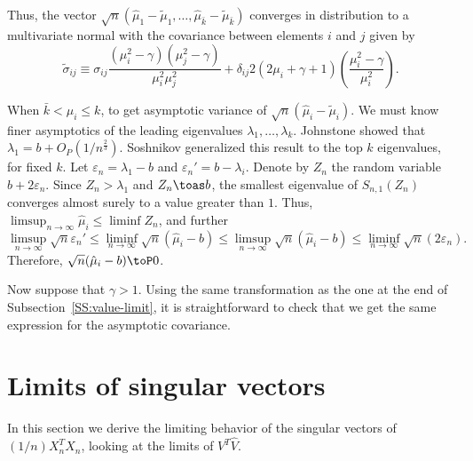 Thus, the vector 
\(
    \sqrt{n} 
    (\hat \mu_1 - \tilde \mu_1, 
     \ldots, 
     \hat \mu_{\bar k} - \tilde \mu_{\bar k}
    )
\)
converges in distribution to a multivariate normal with the covariance
between elements $i$ and $j$ given by
\[
    \tilde \sigma_{ij}
    \equiv
    \sigma_{ij} 
    \frac{(\mu_i^2 - \gamma)(\mu_j^2 - \gamma)}{\mu_i^2 \mu_j^2}
    +
    \delta_{ij}
    2(2\mu_i + \gamma + 1)
    \left(
        \frac{\mu_i^2 - \gamma}{\mu_i^2}
    \right).
\]

When $\bar k < \mu_i \leq k$, to get asymptotic variance of
$\sqrt{n} (\hat \mu_i - \tilde \mu_i)$.  We must know finer asymptotics of
the leading eigenvalues $\lambda_1, \ldots, \lambda_k$.  Johnstone
\cite{johnstone2001dle} showed that $\lambda_1 = b + O_P(1/n^\frac{2}{3})$.
Soshnikov \cite{soshnikov2002nud} generalized this result to the top
$k$ eigenvalues, for fixed $k$.  Let $\varepsilon_n = \lambda_1 - b$  and
$\varepsilon_n' = b - \lambda_i$.  Denote by $Z_n$ the random variable
$b + 2 \varepsilon_n$. Since $Z_n > \lambda_1$ and $Z_n \toas b$,
the smallest eigenvalue of $S_{n,1} (Z_n)$ converges almost surely to a
value greater than $1$.  Thus, 
$\limsup_{n\to\infty} \hat \mu_i \leq \liminf Z_n$, and further
\[
    \limsup_{n\to\infty} \sqrt{n} \varepsilon_n'
    \leq
    \liminf_{n\to\infty} \sqrt{n} (\hat \mu_i - b)
    \leq
    \limsup_{n\to\infty} \sqrt{n} (\hat \mu_i - b)
    \leq
    \liminf_{n\to\infty} \sqrt{n} (2 \varepsilon_n).
\]
Therefore, $\sqrt{n} (\hat \mu_i - b) \toP 0$.

Now suppose that $\gamma > 1$.  Using the same transformation as the one at the end of Subsection~\ref{SS:value-limit}, it is straightforward to 
check that we get the same expression for the asymptotic covariance.

\section{Limits of singular vectors}

In this section we derive the limiting behavior of the singular vectors
of $(1/n) X_n^T X_n$, looking at the limits of $V^T \hat V$.

